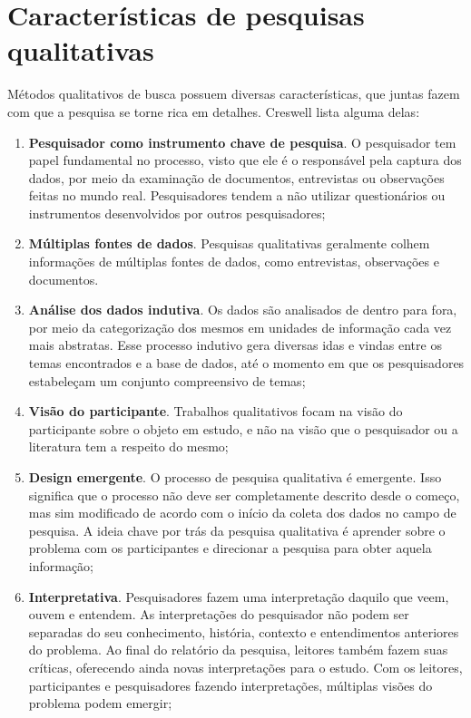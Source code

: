 \section{Características de pesquisas qualitativas}

Métodos qualitativos de busca possuem diversas características, que juntas fazem
com que a pesquisa se torne rica em detalhes. Creswell \cite{creswell} lista
alguma delas:

\begin{enumerate}
  
  \item \textbf{Pesquisador como instrumento chave de pesquisa}. O pesquisador
  tem papel fundamental no processo, visto que ele é o responsável pela captura dos
  dados, por meio da examinação de documentos, entrevistas ou observações feitas
  no mundo real. Pesquisadores tendem a não utilizar questionários ou
  instrumentos desenvolvidos por outros pesquisadores;
  
  \item \textbf{Múltiplas fontes de dados}. Pesquisas qualitativas geralmente
  colhem informações de múltiplas fontes de dados, como entrevistas,
  observações e documentos.
  
  \item \textbf{Análise dos dados indutiva}. Os dados são analisados de dentro
  para fora, por meio da categorização dos mesmos em unidades de informação cada
  vez mais abstratas. Esse processo indutivo gera diversas idas e vindas entre
  os temas encontrados e a base de dados, até o momento em que os pesquisadores
  estabeleçam um conjunto compreensivo de temas;
  
  \item \textbf{Visão do participante}. Trabalhos qualitativos focam na visão do
  participante sobre o objeto em estudo, e não na visão que o pesquisador ou a
  literatura tem a respeito do mesmo;
  
  \item \textbf{Design emergente}. O processo de pesquisa qualitativa é
  emergente. Isso significa que o processo não deve ser completamente descrito
  desde o começo, mas sim modificado de acordo com o início da coleta dos dados
  no campo de pesquisa. A ideia chave por trás da pesquisa qualitativa é
  aprender sobre o problema com os participantes e direcionar a pesquisa para
  obter aquela informação;
  
  \item \textbf{Interpretativa}. Pesquisadores fazem uma interpretação daquilo
  que veem, ouvem e entendem. As interpretações do pesquisador não podem ser
  separadas do seu conhecimento, história, contexto e entendimentos anteriores
  do problema. Ao final do relatório da pesquisa, leitores também fazem suas
  críticas, oferecendo ainda novas interpretações para o estudo. Com os
  leitores, participantes e pesquisadores fazendo interpretações, múltiplas
  visões do problema podem emergir;
  
\end{enumerate} 


